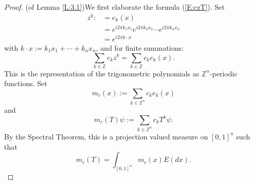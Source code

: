 \documentclass{birkmult}
\theoremstyle{definition}
\theoremstyle{remark}
\numberwithin{equation}{section}
\begin{document}
\begin{proof}
(of Lemma \ref{L:3.1})We first elaborate the formula (\ref{E:czT}).  Set
\begin{align*}
  z^{k} :&= e_{k}(x)  \\
        &= e^{i2\pi k_{1}x_{1}}e^{i2\pi k_{2}x_{2}} \cdots e^{i2\pi k_{n}x_{n}} \\
        &=e^{i2\pi k\cdot x}
\end{align*}
with $k \cdot x:=k_{1}x_{1}+ \cdots + k_{n}x_{n}$, and for finite 
summations:
\begin{equation}
\label{E:trigrep}
  \sum_{k \in \mathbb{Z}}c_{k}z^{k} = \sum_{k \in \mathbb{Z}}c_{k}e_{k}(x).
\end{equation}
This is the representation of the trigonometric polynomials as 
$\mathbb{Z}^{n}$-periodic functions.  Set
\[
  m_{c}(x) := \sum_{k \in \mathbb{Z}^{n}}c_{k}e_{k}(x)
\]
and
\begin{equation}
\label{E:mcTpsi}
  m_{c}(T)\psi := \sum_{k \in \mathbb{Z}^{n}}c_{k}T^{k}\psi.
\end{equation}
By the Spectral Theorem, this is a projection valued measure on $[0,1]^{n}$
such that
\begin{equation}
\label{E:mcE}
  m_{c}(T) = \int_{[0,1]^{n}}m_{c}(x)E(dx).
\end{equation}


\end{proof}
\end{document}
